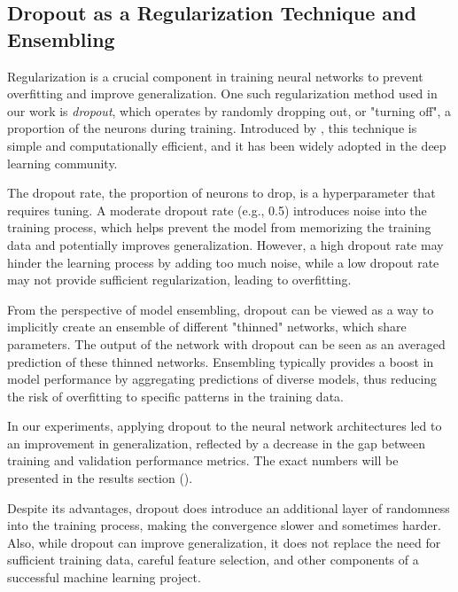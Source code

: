 \subsection{Dropout as a Regularization Technique and Ensembling}
\label{sec:dropout}

Regularization is a crucial component in training neural networks to prevent overfitting and improve generalization. One
such regularization method used in our work is \emph{dropout}, which operates by randomly dropping out, or "turning
off", a proportion of the neurons during training. Introduced by \cite{dropout}, this
technique is simple and computationally efficient, and it has been widely adopted in the deep learning community.

The dropout rate, the proportion of neurons to drop, is a hyperparameter that requires tuning. A moderate dropout rate
(e.g., 0.5) introduces noise into the training process, which helps prevent the model from memorizing the training data
and potentially improves generalization. However, a high dropout rate may hinder the learning process by adding too much
noise, while a low dropout rate may not provide sufficient regularization, leading to overfitting.

From the perspective of model ensembling, dropout can be viewed as a way to implicitly create an ensemble of different
"thinned" networks, which share parameters. The output of the network with dropout can be seen as an averaged prediction
of these thinned networks. Ensembling typically provides a boost in model performance by aggregating predictions of
diverse models, thus reducing the risk of overfitting to specific patterns in the training data.

In our experiments, applying dropout to the neural network architectures led to an improvement in generalization,
reflected by a decrease in the gap between training and validation performance metrics. The exact numbers will be
presented in the results section ().

Despite its advantages, dropout does introduce an additional layer of randomness into the training process, making the
convergence slower and sometimes harder. Also, while dropout can improve generalization, it does not replace the need
for sufficient training data, careful feature selection, and other components of a successful machine learning project.